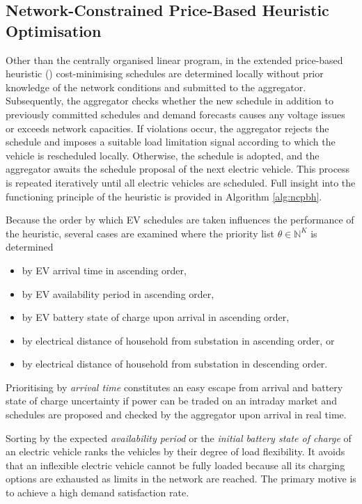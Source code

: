 \subsection{Network-Constrained Price-Based Heuristic Optimisation}

Other than the centrally organised linear program, in the extended price-based heuristic () cost-minimising schedules are determined locally without prior knowledge of the network conditions and submitted to the aggregator. Subsequently, the aggregator checks whether the new schedule in addition to previously committed schedules and demand forecasts causes any voltage issues or exceeds network capacities. If violations occur, the aggregator rejects the schedule and imposes a suitable load limitation signal according to which the vehicle is rescheduled locally. Otherwise, the schedule is adopted, and the aggregator awaits the schedule proposal of the next electric vehicle. This process is repeated iteratively until all electric vehicles are scheduled. Full insight into the functioning principle of the heuristic is provided in Algorithm \ref{alg:ncpbh}.

Because the order by which EV schedules are taken influences the performance of the heuristic, several cases are examined where the priority list $\theta \in \mathbb{N}^K$ is determined

\begin{itemize}
	\item by EV arrival time in ascending order,
	\item by EV availability period in ascending order,
	\item by EV battery state of charge upon arrival in ascending order,
	\item by electrical distance of household from substation in ascending order, or
	\item by electrical distance of household from substation in descending order.
\end{itemize}

Prioritising by \textit{arrival time} constitutes an easy escape from arrival and battery state of charge uncertainty if power can be traded on an intraday market and schedules are proposed and checked by the aggregator upon arrival in real time.

Sorting by the expected \textit{availability period} or the \textit{initial battery state of charge} of an electric vehicle ranks the vehicles by their degree of load flexibility. It avoids that an inflexible electric vehicle cannot be fully loaded because all its charging options are exhausted as limits in the network are reached. The primary motive is to achieve a high demand satisfaction rate.

